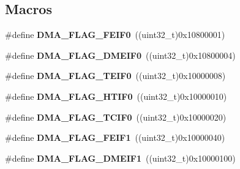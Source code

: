 \subsection*{Macros}
\begin{DoxyCompactItemize}
\item 
\mbox{\label{group___d_m_a__flags__definition_ga4e09c71ab9d85493fba241fa90f60eff}} 
\#define {\bfseries D\+M\+A\+\_\+\+F\+L\+A\+G\+\_\+\+F\+E\+I\+F0}~((uint32\+\_\+t)0x10800001)
\item 
\mbox{\label{group___d_m_a__flags__definition_gaf309e18b8d4113c51de6d23794bdaaab}} 
\#define {\bfseries D\+M\+A\+\_\+\+F\+L\+A\+G\+\_\+\+D\+M\+E\+I\+F0}~((uint32\+\_\+t)0x10800004)
\item 
\mbox{\label{group___d_m_a__flags__definition_ga8a1b602ca53eca06597284af6edd4eca}} 
\#define {\bfseries D\+M\+A\+\_\+\+F\+L\+A\+G\+\_\+\+T\+E\+I\+F0}~((uint32\+\_\+t)0x10000008)
\item 
\mbox{\label{group___d_m_a__flags__definition_gaa76090f6351c3feb8e844460820236c6}} 
\#define {\bfseries D\+M\+A\+\_\+\+F\+L\+A\+G\+\_\+\+H\+T\+I\+F0}~((uint32\+\_\+t)0x10000010)
\item 
\mbox{\label{group___d_m_a__flags__definition_gae5220ac32b929e3ffce6d6239cc2a39c}} 
\#define {\bfseries D\+M\+A\+\_\+\+F\+L\+A\+G\+\_\+\+T\+C\+I\+F0}~((uint32\+\_\+t)0x10000020)
\item 
\mbox{\label{group___d_m_a__flags__definition_ga13a9f5ad620803b1f59c329ea291cdce}} 
\#define {\bfseries D\+M\+A\+\_\+\+F\+L\+A\+G\+\_\+\+F\+E\+I\+F1}~((uint32\+\_\+t)0x10000040)
\item 
\mbox{\label{group___d_m_a__flags__definition_ga1f52407d92d389200727d1731ed2bf41}} 
\#define {\bfseries D\+M\+A\+\_\+\+F\+L\+A\+G\+\_\+\+D\+M\+E\+I\+F1}~((uint32\+\_\+t)0x10000100)
\item 
\mbox{\label{group___d_m_a__flags__definition_gaebca425399650686931b35d650ec9872}} 

\end{DoxyCompactItemize}
